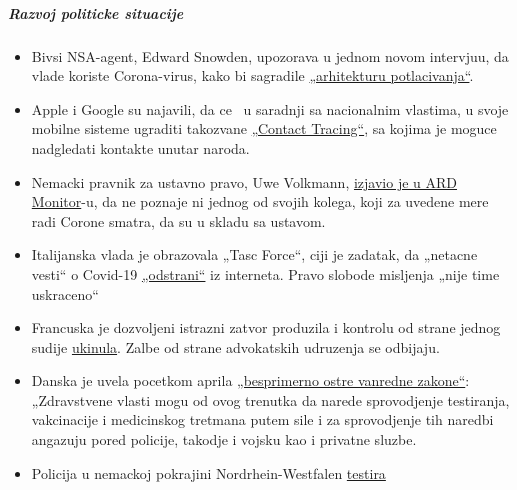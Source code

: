 \hypertarget{razvoj-politicke-situacije}{%
\subparagraph{\texorpdfstring{\textbf{Razvoj politicke
situacije}}{Razvoj politicke situacije}}\label{razvoj-politicke-situacije}}

\begin{itemize}
\tightlist
\item
  Bivsi NSA-agent, Edward Snowden, upozorava u jednom novom intervjuu,
  da vlade koriste Corona-virus, kako bi sagradile
  \href{https://www.vice.com/en_us/article/bvge5q/snowden-warns-governments-are-using-coronavirus-to-build-the-architecture-of-oppression}{„arhitekturu
  potlacivanja``}.
\item
  Apple i Google su najavili, da ce ~u saradnji sa nacionalnim vlastima,
  u svoje mobilne sisteme ugraditi takozvane
  \href{https://www.bloomberg.com/news/articles/2020-04-10/apple-google-bring-covid-19-contact-tracing-to-3-billion-people}{„Contact
  Tracing``}, sa kojima je moguce nadgledati kontakte unutar naroda.
\item
  Nemacki pravnik za ustavno pravo, Uwe Volkmann,
  \href{https://www.youtube.com/watch?v=DvzrGLvzllU}{izjavio je u ARD
  Monitor}-u, da ne poznaje ni jednog od svojih kolega, koji za uvedene
  mere radi Corone smatra, da su u skladu sa ustavom.
\item
  Italijanska vlada je obrazovala „Tasc Force``, ciji je zadatak, da
  „netacne vesti`` o Covid-19
  \href{https://www.faz.net/aktuell/feuilleton/medien/corona-in-italien-das-virus-und-die-wahrheit-16714529.html}{„odstrani``}
  iz interneta. Pravo slobode misljenja „nije time uskraceno``
\item
  Francuska je dozvoljeni istrazni zatvor produzila i kontrolu od strane
  jednog sudije
  \href{https://www.lefigaro.fr/politique/coronavirus-le-conseil-d-etat-sur-la-ligne-de-crete-des-libertes-publiques-20200406}{ukinula}.
  Zalbe od strane advokatskih udruzenja se odbijaju.
\item
  Danska je uvela pocetkom aprila
  \href{https://www.fr.de/politik/coronavirus-sars-cov-2-daenemark-notfalls-militaer-13598503.html}{„besprimerno
  ostre vanredne zakone``}: „Zdravstvene vlasti mogu od ovog trenutka da
  narede sprovodjenje testiranja, vakcinacije i medicinskog tretmana
  putem sile i za sprovodjenje tih naredbi angazuju pored policije,
  takodje i vojsku kao i privatne sluzbe.
\item
  Policija u nemackoj pokrajini Nordrhein-Westfalen
  \href{https://rp-online.de/nrw/panorama/nrw-polizei-testet-drohnen-bei-einsaetzen-wegen-corona-massnahmen_aid-50006143}{testira
}
\end{itemize}
